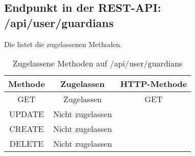 \subsection{Endpunkt in der REST-API: /api/user/guardians}
Die  listet die zugelassenen Methoden. 

\begin{table}[!htbp]
	\begin{tabular}{|c|c|c|}
		\hline
			\textbf{Methode} & \textbf{Zugelassen} & \textbf{HTTP-Methode} \\ \hline
			GET & Zugelassen & GET \\ \hline
			UPDATE & Nicht zugelassen & \\ \hline 
			CREATE & Nicht zugelassen & \\ \hline 
			DELETE & Nicht zugelassen & \\ \hline
	\end{tabular}

		\caption{Zugelassene Methoden auf /api/user/guardians}
		\label{tab:end:rest:api:user:guardians:meth}
\end{table}